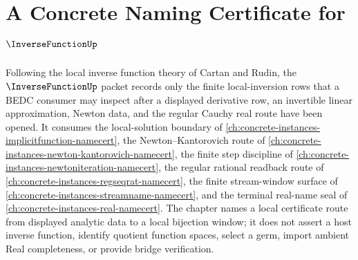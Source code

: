 \chapter{A Concrete Naming Certificate for $\InverseFunctionUp$}
\label{ch:concrete-instances-inverse-function-namecert}

Following the local inverse function theory of Cartan and Rudin, the $\InverseFunctionUp$ packet records only the finite local-inversion rows that a BEDC consumer may inspect after a displayed derivative row, an invertible linear approximation, Newton data, and the regular Cauchy real route have been opened. It consumes the local-solution boundary of \autoref{ch:concrete-instances-implicitfunction-namecert}, the Newton--Kantorovich route of \autoref{ch:concrete-instances-newton-kantorovich-namecert}, the finite step discipline of \autoref{ch:concrete-instances-newtoniteration-namecert}, the regular rational readback route of \autoref{ch:concrete-instances-regseqrat-namecert}, the finite stream-window surface of \autoref{ch:concrete-instances-streamname-namecert}, and the terminal real-name seal of \autoref{ch:concrete-instances-real-namecert}. The chapter names a local certificate route from displayed analytic data to a local bijection window; it does not assert a host inverse function, identify quotient function spaces, select a germ, import ambient Real completeness, or provide bridge verification.

